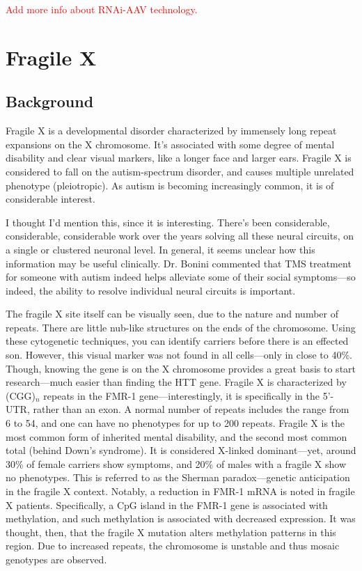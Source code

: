 \textcolor{red}{Add more info about RNAi-AAV technology.}

\section*{Fragile X}

\subsection*{Background}

Fragile X is a developmental disorder characterized by immensely long repeat expansions on the X chromosome. It's associated with some degree of mental disability and clear visual markers, like a longer face and larger ears. Fragile X is considered to fall on the autism-spectrum disorder, and causes multiple unrelated phenotype (pleiotropic). As autism is becoming increasingly common, it is of considerable interest.\newline

I thought I'd mention this, since it is interesting. There's been considerable, considerable, considerable work over the years solving all these neural circuits, on a single or clustered neuronal level. In general, it seems unclear how this information may be useful clinically. Dr. Bonini commented that TMS treatment for someone with autism indeed helps alleviate some of their social symptoms---so indeed, the ability to resolve individual neural circuits is important.\newline

The fragile X site itself can be visually seen, due to the nature and number of repeats. There are little nub-like structures on the ends of the chromosome. Using these cytogenetic techniques, you can identify carriers before there is an effected son. However, this visual marker was not found in all cells---only in close to 40\%. Though, knowing the gene is on the X chromosome provides a great basis to start research---much easier than finding the HTT gene. Fragile X is characterized by (CGG)$_n$ repeats in the FMR-1 gene---interestingly, it is specifically in the 5'-UTR, rather than an exon. A normal number of repeats includes the range from 6 to 54, and one can have no phenotypes for up to 200 repeats. Fragile X is the most common form of inherited mental disability, and the second most common total (behind Down's syndrome). It is considered X-linked dominant---yet, around 30\% of female carriers show symptoms, and 20\% of males with a fragile X show no phenotypes. This is referred to as the Sherman paradox---genetic anticipation in the fragile X context. Notably, a reduction in FMR-1 mRNA is noted in fragile X patients. Specifically, a CpG island in the FMR-1 gene is associated with methylation, and such methylation is associated with decreased expression. It was thought, then, that the fragile X mutation alters methylation patterns in this region. Due to increased repeats, the chromosome is unstable and thus mosaic genotypes are observed.\newline


